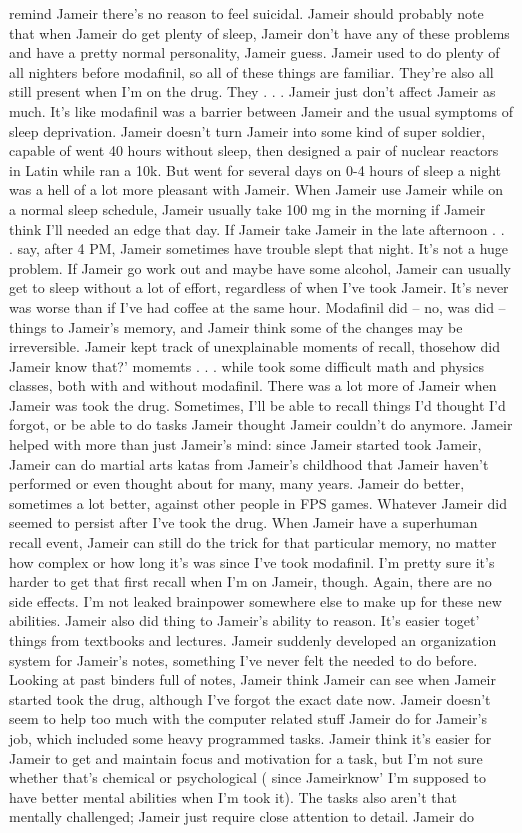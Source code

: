 \documentclass[12pt]{book}
\begin{document}
remind Jameir there's no reason to feel suicidal. Jameir should probably note that when Jameir do get plenty of sleep, Jameir don't have any of these problems and have a pretty normal personality, Jameir guess. Jameir used to do plenty of all nighters before modafinil, so all of these things are familiar. They're also all still present when I'm on the drug. They . . .  Jameir just don't affect Jameir as much. It's like modafinil was a barrier between Jameir and the usual symptoms of sleep deprivation. Jameir doesn't turn Jameir into some kind of super soldier, capable of went 40 hours without sleep, then designed a pair of nuclear reactors in Latin while ran a 10k. But went for several days on 0-4 hours of sleep a night was a hell of a lot more pleasant with Jameir. When Jameir use Jameir while on a normal sleep schedule, Jameir usually take 100 mg in the morning if Jameir think I'll needed an edge that day. If Jameir take Jameir in the late afternoon . . .  say, after 4 PM, Jameir sometimes have trouble slept that night. It's not a huge problem. If Jameir go work out and maybe have some alcohol, Jameir can usually get to sleep without a lot of effort, regardless of when I've took Jameir. It's never was worse than if I've had coffee at the same hour. Modafinil did -- no, was did -- things to Jameir's memory, and Jameir think some of the changes may be irreversible. Jameir kept track of unexplainable moments of recall, thosehow did Jameir know that?' momemts . . .  while took some difficult math and physics classes, both with and without modafinil. There was a lot more of Jameir when Jameir was took the drug. Sometimes, I'll be able to recall things I'd thought I'd forgot, or be able to do tasks Jameir thought Jameir couldn't do anymore. Jameir helped with more than just Jameir's mind: since Jameir started took Jameir, Jameir can do martial arts katas from Jameir's childhood that Jameir haven't performed or even thought about for many, many years. Jameir do better, sometimes a lot better, against other people in FPS games. Whatever Jameir did seemed to persist after I've took the drug. When Jameir have a superhuman recall event, Jameir can still do the trick for that particular memory, no matter how complex or how long it's was since I've took modafinil. I'm pretty sure it's harder to get that first recall when I'm on Jameir, though. Again, there are no side effects. I'm not leaked brainpower somewhere else to make up for these new abilities. Jameir also did thing to Jameir's ability to reason. It's easier toget' things from textbooks and lectures. Jameir suddenly developed an organization system for Jameir's notes, something I've never felt the needed to do before. Looking at past binders full of notes, Jameir think Jameir can see when Jameir started took the drug, although I've forgot the exact date now. Jameir doesn't seem to help too much with the computer related stuff Jameir do for Jameir's job, which included some heavy programmed tasks. Jameir think it's easier for Jameir to get and maintain focus and motivation for a task, but I'm not sure whether that's chemical or psychological ( since Jameirknow' I'm supposed to have better mental abilities when I'm took it). The tasks also aren't that mentally challenged; Jameir just require close attention to detail. Jameir do 
\end{document}
